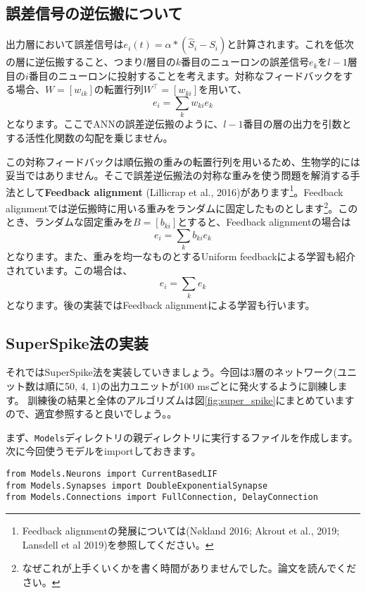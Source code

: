 \subsection{誤差信号の逆伝搬について}
出力層において誤差信号は$e_i(t)=\alpha * \left(\hat{S}_{i}-S_{i}\right)$と計算されます。これを低次の層に逆伝搬すること、つまり$l$層目の$k$番目のニューロンの誤差信号$e_k$を$l-1$層目の$i$番目のニューロンに投射することを考えます。対称なフィードバックをする場合、$W=[w_{ik}]$の転置行列$W^\intercal=[w_{ki}]$を用いて、
\begin{equation}
e_i=\sum_k w_{ki} e_k
\end{equation}
となります。ここでANNの誤差逆伝搬のように、$l-1$番目の層の出力を引数とする活性化関数の勾配を乗じません。\par
この対称フィードバックは順伝搬の重みの転置行列を用いるため、生物学的には妥当ではありません。そこで誤差逆伝搬法の対称な重みを使う問題を解消する手法として\textbf{Feedback alignment} (Lillicrap et al., 2016)があります\footnote{Feedback alignmentの発展については(Nøkland 2016; Akrout et al., 2019; Lansdell et al 2019)を参照してください。}。Feedback alignmentでは逆伝搬時に用いる重みをランダムに固定したものとします\footnote{なぜこれが上手くいくかを書く時間がありませんでした。論文を読んでください。}。このとき、ランダムな固定重みを$B=[b_{ki}]$とすると、Feedback alignmentの場合は
\begin{equation}
e_i=\sum_k b_{ki} e_k
\end{equation}
となります。また、重みを均一なものとするUniform feedbackによる学習も紹介されています。この場合は、
\begin{equation}
e_i=\sum_k e_k
\end{equation}
となります。後の実装ではFeedback alignmentによる学習も行います。
\subsection{SuperSpike法の実装}
それではSuperSpike法を実装していきましょう。今回は3層のネットワーク(ユニット数は順に50, 4, 1)の出力ユニットが100 msごとに発火するように訓練します。 訓練後の結果と全体のアルゴリズムは図\ref{fig:super_spike}にまとめていますので、適宜参照すると良いでしょう。。\par
まず、\texttt{Models}ディレクトリの親ディレクトリに実行するファイルを作成します。次に今回使うモデルをimportしておきます。
\begin{verbatim}
from Models.Neurons import CurrentBasedLIF
from Models.Synapses import DoubleExponentialSynapse
from Models.Connections import FullConnection, DelayConnection
\end{verbatim}
